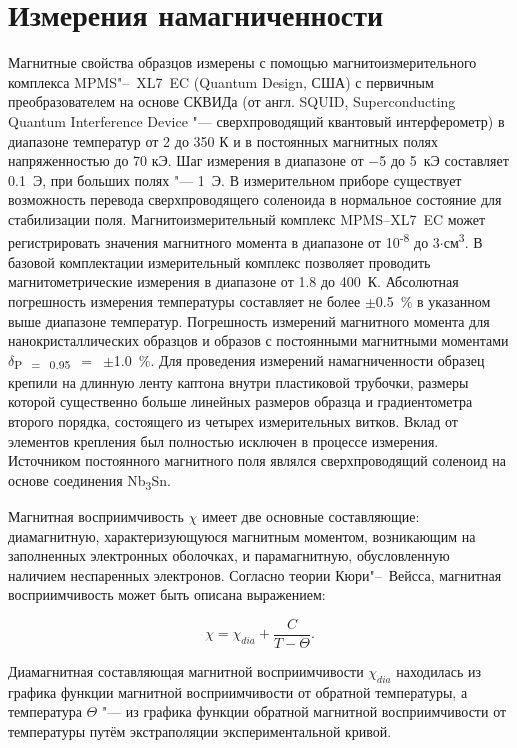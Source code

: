 \section{Измерения намагниченности} \label{sect2_6}
Магнитные свойства образцов измерены с
помощью магнитоизмерительного комплекса
MPMS"--~XL7~EC (Quantum Design, США) с первичным преобразователем на основе СКВИДа (от англ. SQUID, Superconducting Quantum Interference Device "--- сверхпроводящий квантовый интерферометр) в диапазоне температур от 2 до 350 К и в постоянных магнитных полях напряженностью до 70 кЭ. Шаг измерения в диапазоне от $-$5 до 5~кЭ составляет 0.1~Э, при больших полях "--- 1~Э. В измерительном приборе существует возможность перевода сверхпроводящего соленоида в нормальное состояние для стабилизации поля.
Магнитоизмерительный комплекс MPMS--XL7~EC может регистрировать значения магнитного момента в диапазоне от 10\textsuperscript{-8} до 3$\cdot$см\textsuperscript{3}.
В базовой комплектации измерительный комплекс позволяет проводить магнитометрические измерения в диапазоне от 1.8 до 400~К.
Абсолютная погрешность измерения температуры составляет не более $\pm$0.5~\% в указанном выше диапазоне температур.
Погрешность измерений магнитного момента для нанокристаллических образцов и образов с постоянными магнитными моментами $\delta$\textsubscript{P~$=$~0.95}~$=$~$\pm$1.0~\%.
Для проведения измерений намагниченности образец крепили на длинную
ленту каптона внутри пластиковой трубочки, размеры которой существенно больше линейных размеров образца и градиентометра второго порядка,
состоящего из четырех измерительных витков.
Вклад от элементов крепления был полностью исключен в процессе измерения. Источником постоянного магнитного поля являлся сверхпроводящий
соленоид на основе соединения Nb\textsubscript{3}Sn.


Магнитная восприимчивость $\chi$ имеет две основные составляющие: диамагнитную, характеризующуюся магнитным моментом, возникающим на заполненных электронных оболочках, и парамагнитную, обусловленную наличием неспаренных электронов. Согласно теории Кюри"--~Вейсса, магнитная
восприимчивость может быть описана выражением:

\begin{equation}
  \label{eq:equation2.1}
  \chi = \chi_{dia}+\frac{C}{T - \Theta}.
\end{equation}

Диамагнитная составляющая магнитной восприимчивости $\chi_{dia}$ находилась из графика функции
магнитной восприимчивости от обратной температуры, а температура $\Theta$ "--- из графика функции обратной магнитной восприимчивости от
температуры путём экстраполяции экспериментальной кривой.


